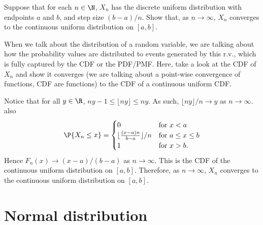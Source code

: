	\begin{exercise}
		Suppose that for each $n \in \N$, $X_{n}$ has the discrete uniform distribution with endpoints $a$ and $b$, and step size $(b - a) / n$. Show that, as $n \to \infty$, $X_n$ converges to the continuous uniform distribution on $[a, b]$.
		\begin{hint}
			When we talk about the distribution of a random variable, we are talking about how the probability values are distributed to events generated by this r.v., which is fully captured by the CDF or the PDF/PMF. Here, take a look at the CDF of $X_n$ and show it converges (we are talking about a point-wise convergence of functions, CDF are functions) to the CDF of a continuous uniform CDF.
		\end{hint}
		\begin{solution}
			Notice that for all $y \in \R$, $ny - 1 \le \lfloor ny \rfloor \le ny $. As such, $ \lfloor n y \rfloor / n \to y $ as $n\rightarrow \infty$. also
			\begin{equation*}
				\P{X_n\leq x}=\begin{cases}
					0 &\text{for } x<a\\
					\lfloor\frac{(x-a)n}{b-a}\rfloor/n &\text{for } a\leq x\leq b\\
					1&\text{for } x>b.
				\end{cases}	
			\end{equation*} 
			Hence $ F_n(x) \to (x - a) / (b - a) $ as $n\rightarrow \infty$. This is the CDF of the continuous uniform distribution on $[a,b]$. Therefore, as $n \to \infty$, $X_n$ converges to the continuous uniform distribution on $[a, b]$.
		\end{solution}
	\end{exercise}

\section{Normal distribution}
\label{sec:section-5.6}
	
